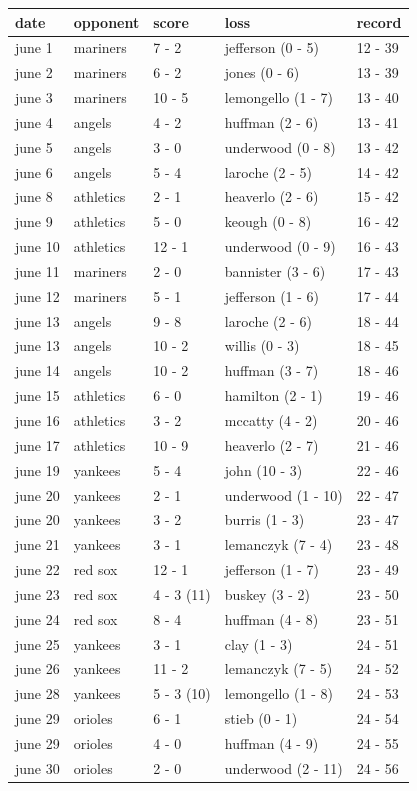 \documentclass{article}
\begin{document}
\begin{tabular}{lllll}
\toprule
date & opponent & score & loss & record \\
\midrule
june 1 & mariners & 7 - 2 & jefferson (0 - 5) & 12 - 39 \\
june 2 & mariners & 6 - 2 & jones (0 - 6) & 13 - 39 \\
june 3 & mariners & 10 - 5 & lemongello (1 - 7) & 13 - 40 \\
june 4 & angels & 4 - 2 & huffman (2 - 6) & 13 - 41 \\
june 5 & angels & 3 - 0 & underwood (0 - 8) & 13 - 42 \\
june 6 & angels & 5 - 4 & laroche (2 - 5) & 14 - 42 \\
june 8 & athletics & 2 - 1 & heaverlo (2 - 6) & 15 - 42 \\
june 9 & athletics & 5 - 0 & keough (0 - 8) & 16 - 42 \\
june 10 & athletics & 12 - 1 & underwood (0 - 9) & 16 - 43 \\
june 11 & mariners & 2 - 0 & bannister (3 - 6) & 17 - 43 \\
june 12 & mariners & 5 - 1 & jefferson (1 - 6) & 17 - 44 \\
june 13 & angels & 9 - 8 & laroche (2 - 6) & 18 - 44 \\
june 13 & angels & 10 - 2 & willis (0 - 3) & 18 - 45 \\
june 14 & angels & 10 - 2 & huffman (3 - 7) & 18 - 46 \\
june 15 & athletics & 6 - 0 & hamilton (2 - 1) & 19 - 46 \\
june 16 & athletics & 3 - 2 & mccatty (4 - 2) & 20 - 46 \\
june 17 & athletics & 10 - 9 & heaverlo (2 - 7) & 21 - 46 \\
june 19 & yankees & 5 - 4 & john (10 - 3) & 22 - 46 \\
june 20 & yankees & 2 - 1 & underwood (1 - 10) & 22 - 47 \\
june 20 & yankees & 3 - 2 & burris (1 - 3) & 23 - 47 \\
june 21 & yankees & 3 - 1 & lemanczyk (7 - 4) & 23 - 48 \\
june 22 & red sox & 12 - 1 & jefferson (1 - 7) & 23 - 49 \\
june 23 & red sox & 4 - 3 (11) & buskey (3 - 2) & 23 - 50 \\
june 24 & red sox & 8 - 4 & huffman (4 - 8) & 23 - 51 \\
june 25 & yankees & 3 - 1 & clay (1 - 3) & 24 - 51 \\
june 26 & yankees & 11 - 2 & lemanczyk (7 - 5) & 24 - 52 \\
june 28 & yankees & 5 - 3 (10) & lemongello (1 - 8) & 24 - 53 \\
june 29 & orioles & 6 - 1 & stieb (0 - 1) & 24 - 54 \\
june 29 & orioles & 4 - 0 & huffman (4 - 9) & 24 - 55 \\
june 30 & orioles & 2 - 0 & underwood (2 - 11) & 24 - 56 \\
\bottomrule
\end{tabular}
\end{document}
